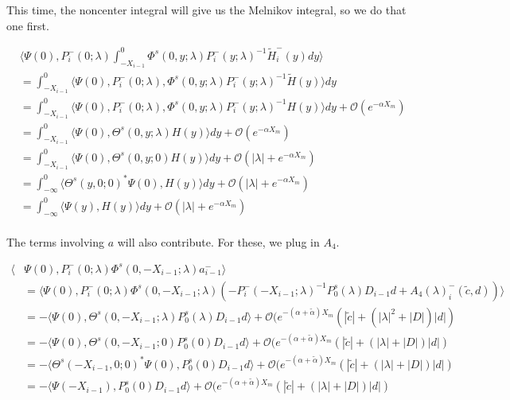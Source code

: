 \documentclass[12pt]{article}
\begin{document}
This time, the noncenter integral will give us the Melnikov integral, so we do that one first.

\begin{align*}
&\langle \Psi(0), P_i^-(0; \lambda) \int_{-X_{i-1}}^0 \Phi^s(0, y; \lambda) P_i^-(y; \lambda)^{-1} \tilde{H}_i^-(y) dy \rangle \\
&= \int_{-X_{i-1}}^0 \langle \Psi(0), P_i^-(0; \lambda), \Phi^s(0, y; \lambda) P_i^-(y; \lambda)^{-1} \tilde{H}(y) \rangle dy \\
&= \int_{-X_{i-1}}^0 \langle \Psi(0), P_i^-(0; \lambda), \Phi^s(0, y; \lambda) P_i^-(y; \lambda)^{-1} H(y) \rangle dy + \mathcal{O}({e^{-\alpha X_m}})\\
&= \int_{-X_{i-1}}^0 \langle \Psi(0), \Theta^s(0, y; \lambda) H(y) \rangle dy + \mathcal{O}({e^{-\alpha X_m}})\\
&= \int_{-X_{i-1}}^0 \langle \Psi(0), \Theta^s(0, y; 0) H(y) \rangle dy + \mathcal{O}(|\lambda| + {e^{-\alpha X_m}})\\
&= \int_{-\infty}^0 \langle \Theta^s(y, 0; 0)^* \Psi(0), H(y) \rangle dy + \mathcal{O}(|\lambda| + {e^{-\alpha X_m}})\\
&= \int_{-\infty}^0 \langle \Psi(y), H(y) \rangle dy + \mathcal{O}(|\lambda| + {e^{-\alpha X_m}})\\
\end{align*}

The terms involving $a$ will also contribute. For these, we plug in $A_4$.

\begin{align*}
\langle &\Psi(0), P_i^-(0; \lambda) \Phi^s(0, -X_{i-1}; \lambda) a_{i-1}^- \rangle \\
&= \langle \Psi(0), P_i^-(0; \lambda) \Phi^s(0, -X_{i-1}; \lambda) (- P_i^-(-X_{i-1}; \lambda)^{-1} P_0^s(\lambda) D_{i-1} d + A_4(\lambda)_i^-(\tilde{c}, d)) \rangle \\
&= -\langle \Psi(0), \Theta^s(0, -X_{i-1}; \lambda) P_0^s(\lambda) D_{i-1} d \rangle + \mathcal{O}( e^{-(\alpha + \tilde{\alpha})X_m}(|\tilde{c}| + (|\lambda|^2 + |D|)|d|) \\
&= -\langle \Psi(0), \Theta^s(0, -X_{i-1}; 0) P_0^s(0) D_{i-1} d \rangle + \mathcal{O}( e^{-(\alpha + \tilde{\alpha})X_m}(|\tilde{c}| + (|\lambda| + |D|)|d|) \\
&= -\langle \Theta^s(-X_{i-1}, 0; 0)^* \Psi(0), P_0^s(0) D_{i-1} d \rangle + \mathcal{O}( e^{-(\alpha + \tilde{\alpha})X_m}(|\tilde{c}| + (|\lambda| + |D|)|d|) \\
&= -\langle \Psi(-X_{i-1}), P_0^s(0) D_{i-1} d \rangle + \mathcal{O}( e^{-(\alpha + \tilde{\alpha})X_m}(|\tilde{c}| + (|\lambda| + |D|)|d|) \\
\end{align*}
\end{document}
